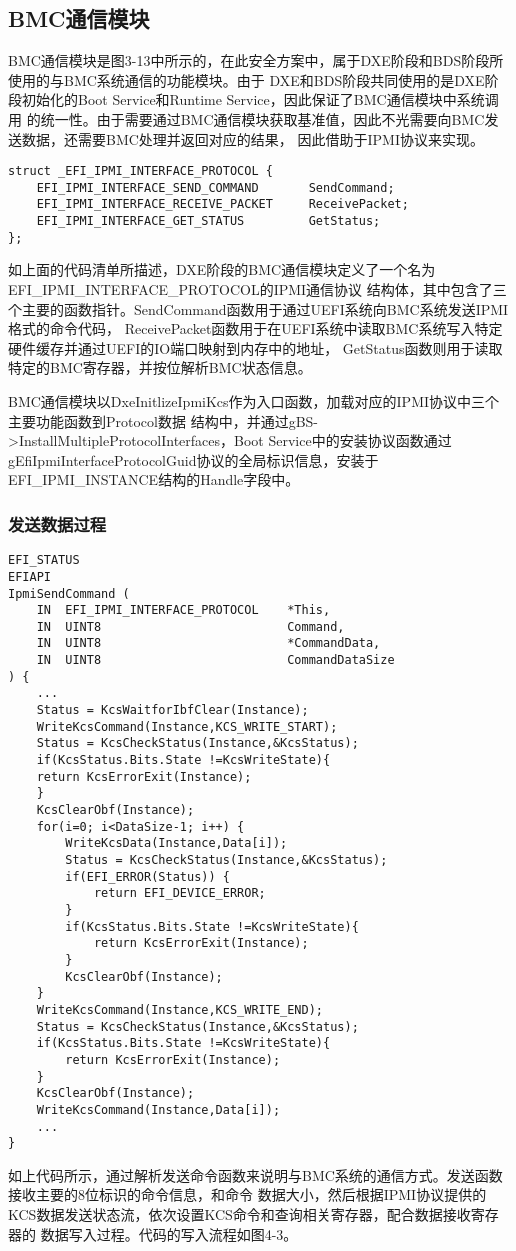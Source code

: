 \subsection{BMC通信模块}
BMC通信模块是图3-13中所示的，在此安全方案中，属于DXE阶段和BDS阶段所使用的与BMC系统通信的功能模块。由于
DXE和BDS阶段共同使用的是DXE阶段初始化的Boot Service和Runtime Service，因此保证了BMC通信模块中系统调用
的统一性。由于需要通过BMC通信模块获取基准值，因此不光需要向BMC发送数据，还需要BMC处理并返回对应的结果，
因此借助于IPMI协议来实现\cite{chinese26}。

\begin{lstlisting}
struct _EFI_IPMI_INTERFACE_PROTOCOL {
    EFI_IPMI_INTERFACE_SEND_COMMAND       SendCommand;
    EFI_IPMI_INTERFACE_RECEIVE_PACKET     ReceivePacket;
    EFI_IPMI_INTERFACE_GET_STATUS         GetStatus;
};
\end{lstlisting}
如上面的代码清单所描述，DXE阶段的BMC通信模块定义了一个名为EFI\_IPMI\_INTERFACE\_PROTOCOL的IPMI通信协议
结构体，其中包含了三个主要的函数指针。SendCommand函数用于通过UEFI系统向BMC系统发送IPMI格式的命令代码，
ReceivePacket函数用于在UEFI系统中读取BMC系统写入特定硬件缓存并通过UEFI的IO端口映射到内存中的地址，
GetStatus函数则用于读取特定的BMC寄存器，并按位解析BMC状态信息。
\par BMC通信模块以DxeInitlizeIpmiKcs作为入口函数，加载对应的IPMI协议中三个主要功能函数到Protocol数据
结构中，并通过gBS->InstallMultipleProtocolInterfaces，Boot Service中的安装协议函数通过
gEfiIpmiInterfaceProtocolGuid协议的全局标识信息，安装于EFI\_IPMI\_INSTANCE结构的Handle字段中。

\subsubsection{发送数据过程}

\begin{lstlisting}
EFI_STATUS
EFIAPI
IpmiSendCommand (
    IN  EFI_IPMI_INTERFACE_PROTOCOL    *This,
    IN  UINT8                          Command,
    IN  UINT8                          *CommandData,
    IN  UINT8                          CommandDataSize
) {
    ...
    Status = KcsWaitforIbfClear(Instance);
    WriteKcsCommand(Instance,KCS_WRITE_START);
    Status = KcsCheckStatus(Instance,&KcsStatus);
    if(KcsStatus.Bits.State !=KcsWriteState){
    return KcsErrorExit(Instance);
    }
    KcsClearObf(Instance);
    for(i=0; i<DataSize-1; i++) {
        WriteKcsData(Instance,Data[i]);
        Status = KcsCheckStatus(Instance,&KcsStatus);
        if(EFI_ERROR(Status)) {
            return EFI_DEVICE_ERROR;
        }
        if(KcsStatus.Bits.State !=KcsWriteState){
            return KcsErrorExit(Instance);
        }
        KcsClearObf(Instance);
    }
    WriteKcsCommand(Instance,KCS_WRITE_END);
    Status = KcsCheckStatus(Instance,&KcsStatus);
    if(KcsStatus.Bits.State !=KcsWriteState){
        return KcsErrorExit(Instance);
    }
    KcsClearObf(Instance);
    WriteKcsCommand(Instance,Data[i]);
    ...
}
\end{lstlisting}
如上代码所示，通过解析发送命令函数来说明与BMC系统的通信方式。发送函数接收主要的8位标识的命令信息，和命令
数据大小，然后根据IPMI协议提供的KCS数据发送状态流，依次设置KCS命令和查询相关寄存器，配合数据接收寄存器的
数据写入过程\cite{english22}。代码的写入流程如图4-3。

